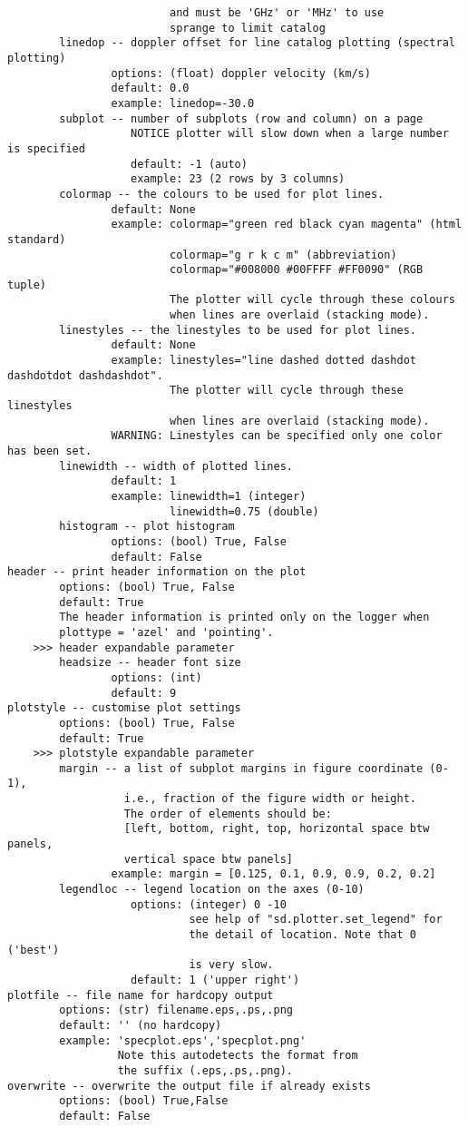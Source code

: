 \begin{verbatim}
                         and must be 'GHz' or 'MHz' to use
                         sprange to limit catalog
        linedop -- doppler offset for line catalog plotting (spectral plotting)
                options: (float) doppler velocity (km/s)
                default: 0.0
                example: linedop=-30.0
        subplot -- number of subplots (row and column) on a page
                   NOTICE plotter will slow down when a large number is specified
                   default: -1 (auto)
                   example: 23 (2 rows by 3 columns)
        colormap -- the colours to be used for plot lines. 
                default: None
                example: colormap="green red black cyan magenta" (html standard)
                         colormap="g r k c m" (abbreviation)
                         colormap="#008000 #00FFFF #FF0090" (RGB tuple)
                         The plotter will cycle through these colours 
                         when lines are overlaid (stacking mode).
        linestyles -- the linestyles to be used for plot lines. 
                default: None
                example: linestyles="line dashed dotted dashdot dashdotdot dashdashdot". 
                         The plotter will cycle through these linestyles 
                         when lines are overlaid (stacking mode). 
                WARNING: Linestyles can be specified only one color has been set. 
        linewidth -- width of plotted lines. 
                default: 1
                example: linewidth=1 (integer)
                         linewidth=0.75 (double)
        histogram -- plot histogram
                options: (bool) True, False
                default: False
header -- print header information on the plot
        options: (bool) True, False
        default: True
        The header information is printed only on the logger when 
        plottype = 'azel' and 'pointing'. 
    >>> header expandable parameter
        headsize -- header font size
                options: (int)
                default: 9
plotstyle -- customise plot settings
        options: (bool) True, False
        default: True
    >>> plotstyle expandable parameter
        margin -- a list of subplot margins in figure coordinate (0-1), 
                  i.e., fraction of the figure width or height.
                  The order of elements should be:
                  [left, bottom, right, top, horizontal space btw panels,
                  vertical space btw panels]
                example: margin = [0.125, 0.1, 0.9, 0.9, 0.2, 0.2]
        legendloc -- legend location on the axes (0-10)
                   options: (integer) 0 -10 
                            see help of "sd.plotter.set_legend" for 
                            the detail of location. Note that 0 ('best')
                            is very slow. 
                   default: 1 ('upper right')
plotfile -- file name for hardcopy output
        options: (str) filename.eps,.ps,.png
        default: '' (no hardcopy)
        example: 'specplot.eps','specplot.png'
                 Note this autodetects the format from
                 the suffix (.eps,.ps,.png).
overwrite -- overwrite the output file if already exists
        options: (bool) True,False
        default: False
\end{verbatim}

